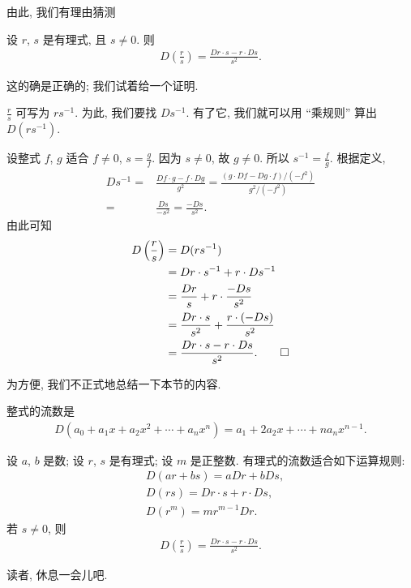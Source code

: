 由此, 我们有理由猜测
\begin{proposition}
    设 $r$, $s$ 是有理式, 且 $s \neq 0$. 则
    \begin{align*}
        D \left( \frac{r}{s} \right) = \frac{Dr \cdot s - r \cdot Ds}{s^2}.
    \end{align*}
\end{proposition}

这的确是正确的; 我们试着给一个证明.
\begin{pf}
    $\frac{r}{s}$ 可写为 $rs^{-1}$. 为此, 我们要找 $Ds^{-1}$. 有了它, 我们就可以用 ``乘规则'' 算出 $D(rs^{-1})$.

    设整式 $f$, $g$ 适合 $f \neq 0$, $s = \frac{g}{f}$. 因为 $s \neq 0$, 故 $g \neq 0$. 所以 $s^{-1} = \frac{f}{g}$. 根据定义,
    \begin{align*}
        Ds^{-1}
        = {} & \frac{Df \cdot g - f \cdot Dg}{g^2} = \frac{(g \cdot Df - Dg \cdot f)/(-f^2)}{g^2/(-f^2)} \\
        = {} & \frac{Ds}{-s^2} = \frac{-Ds}{s^2}.
    \end{align*}
    由此可知
    \begin{align*}
        D \left( \frac{r}{s} \right)
        = {} & D(rs^{-1})                                         \\
        = {} & Dr \cdot s^{-1} + r \cdot Ds^{-1}                  \\
        = {} & \frac{Dr}{s} + r \cdot \frac{-Ds}{s^2}             \\
        = {} & \frac{Dr \cdot s}{s^2} + \frac{r \cdot (-Ds)}{s^2} \\
        = {} & \frac{Dr \cdot s - r \cdot Ds}{s^2}. \qedhere
    \end{align*}
\end{pf}

为方便, 我们不正式地总结一下本节的内容.
\begin{proposition}
    整式的流数是
    \begin{align*}
        D(a_0 + a_1 x + a_2 x^2 + \cdots + a_n x^n) = a_1 + 2a_2 x + \cdots + na_n x^{n-1}.
    \end{align*}

    设 $a$, $b$ 是数; 设 $r$, $s$ 是有理式; 设 $m$ 是正整数. 有理式的流数适合如下运算规则:
    \begin{align*}
         & D(ar + bs) = aDr + bDs,          \\
         & D(rs) = Dr \cdot s + r \cdot Ds, \\
         & D(r^m) = mr^{m-1} Dr.
    \end{align*}
    若 $s \neq 0$, 则
    \begin{align*}
        D \left( \frac{r}{s} \right) = \frac{Dr \cdot s - r \cdot Ds}{s^2}.
    \end{align*}
\end{proposition}

读者, 休息一会{\scriptsize 儿}吧.
